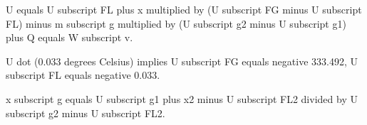 U equals U subscript FL plus x multiplied by (U subscript FG minus U subscript FL) minus m subscript g multiplied by (U subscript g2 minus U subscript g1) plus Q equals W subscript v.  

U dot (0.033 degrees Celsius) implies U subscript FG equals negative 333.492, U subscript FL equals negative 0.033.  

x subscript g equals U subscript g1 plus x2 minus U subscript FL2 divided by U subscript g2 minus U subscript FL2.